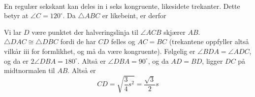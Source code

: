 





\footnotesize
\opgt 	

 \\
En regulær sekskant kan deles in i seks kongruente, likesidete trekanter. Dette betyr at $ \angle C=120^\circ$. Da $ \triangle ABC $ er likebeint, er derfor

Vi lar $ D $ være punktet der halveringslinja til $ \angle ACB $ skjærer $ AB $. $ \triangle DAC\cong \triangle DBC $ fordi de har $ CD $ felles og $ AC=BC $ (trekantene oppfyller altså vilkår iii for formlikhet, og må da være kongruente). Følgelig er $ \angle BDA=\angle ADC $, og da er $ 2\angle DBA=180^\circ $. Altså er $ \angle DBA=90^\circ $, og da $ AD=BD $, ligger $ DC $ på midtnormalen til $ AB $.
\newpage
{}
Altså er 
\[ CD=\sqrt{\frac{3}{4}s^2}=\frac{\sqrt{3}}{2}s \]

